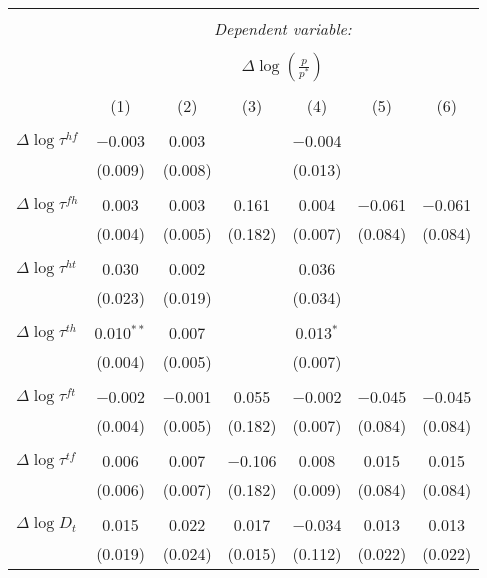 
\begin{tabular}{@{\extracolsep{5pt}}lcccccc} 
\\[-1.8ex]\hline 
\hline \\[-1.8ex] 
 & \multicolumn{6}{c}{\textit{Dependent variable:}} \\ 
\cline{2-7} 
\\[-1.8ex] & \multicolumn{6}{c}{$\Delta \log \left(\frac{p}{p^*} \right)$} \\ 
\\[-1.8ex] & (1) & (2) & (3) & (4) & (5) & (6)\\ 
\hline \\[-1.8ex] 
 $\Delta \log \tau^{hf}$ & $-$0.003 & 0.003 &  & $-$0.004 &  &  \\ 
  & (0.009) & (0.008) &  & (0.013) &  &  \\ 
  & & & & & & \\ 
 $\Delta \log \tau^{fh}$ & 0.003 & 0.003 & 0.161 & 0.004 & $-$0.061 & $-$0.061 \\ 
  & (0.004) & (0.005) & (0.182) & (0.007) & (0.084) & (0.084) \\ 
  & & & & & & \\ 
 $\Delta \log \tau^{ht}$ & 0.030 & 0.002 &  & 0.036 &  &  \\ 
  & (0.023) & (0.019) &  & (0.034) &  &  \\ 
  & & & & & & \\ 
 $\Delta \log \tau^{th}$ & 0.010$^{**}$ & 0.007 &  & 0.013$^{*}$ &  &  \\ 
  & (0.004) & (0.005) &  & (0.007) &  &  \\ 
  & & & & & & \\ 
 $\Delta \log \tau^{ft}$ & $-$0.002 & $-$0.001 & 0.055 & $-$0.002 & $-$0.045 & $-$0.045 \\ 
  & (0.004) & (0.005) & (0.182) & (0.007) & (0.084) & (0.084) \\ 
  & & & & & & \\ 
 $\Delta \log \tau^{tf}$ & 0.006 & 0.007 & $-$0.106 & 0.008 & 0.015 & 0.015 \\ 
  & (0.006) & (0.007) & (0.182) & (0.009) & (0.084) & (0.084) \\ 
  & & & & & & \\ 
 $\Delta \log D_t$ & 0.015 & 0.022 & 0.017 & $-$0.034 & 0.013 & 0.013 \\ 
  & (0.019) & (0.024) & (0.015) & (0.112) & (0.022) & (0.022) \\ 

\end{tabular}
